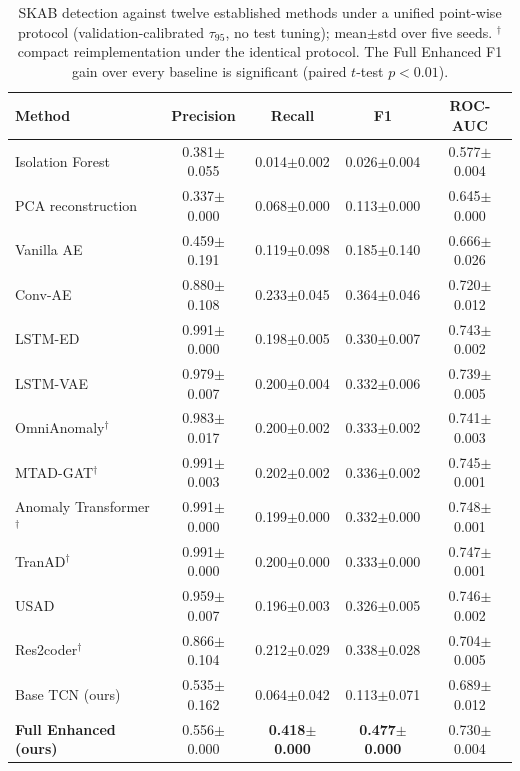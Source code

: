\begin{table}[H]
\centering
\caption{SKAB detection against twelve established methods under a unified point-wise protocol (validation-calibrated $\tau_{95}$, no test tuning); mean$\pm$std over five seeds. $^{\dagger}$ compact reimplementation under the identical protocol. The Full Enhanced F1 gain over every baseline is significant (paired $t$-test $p<0.01$).}
\label{table:skab_baselines}
\setlength{\tabcolsep}{5pt}\small
\begin{tabular}{lcccc}
\toprule
\textbf{Method} & \textbf{Precision} & \textbf{Recall} & \textbf{F1} & \textbf{ROC-AUC} \\
\midrule
Isolation Forest~\cite{liu2008isolation} & 0.381$\pm$0.055 & 0.014$\pm$0.002 & 0.026$\pm$0.004 & 0.577$\pm$0.004 \\
PCA reconstruction & 0.337$\pm$0.000 & 0.068$\pm$0.000 & 0.113$\pm$0.000 & 0.645$\pm$0.000 \\
Vanilla AE~\cite{skab_dataset} & 0.459$\pm$0.191 & 0.119$\pm$0.098 & 0.185$\pm$0.140 & 0.666$\pm$0.026 \\
Conv-AE~\cite{skab_dataset} & 0.880$\pm$0.108 & 0.233$\pm$0.045 & 0.364$\pm$0.046 & 0.720$\pm$0.012 \\
LSTM-ED~\cite{malhotra2016lstmed} & 0.991$\pm$0.000 & 0.198$\pm$0.005 & 0.330$\pm$0.007 & 0.743$\pm$0.002 \\
LSTM-VAE~\cite{park2018lstmvae} & 0.979$\pm$0.007 & 0.200$\pm$0.004 & 0.332$\pm$0.006 & 0.739$\pm$0.005 \\
OmniAnomaly$^{\dagger}$~\cite{su2019robust} & 0.983$\pm$0.017 & 0.200$\pm$0.002 & 0.333$\pm$0.002 & 0.741$\pm$0.003 \\
MTAD-GAT$^{\dagger}$~\cite{zhao2020mtadgat} & 0.991$\pm$0.003 & 0.202$\pm$0.002 & 0.336$\pm$0.002 & 0.745$\pm$0.001 \\
Anomaly Transformer$^{\dagger}$~\cite{xu2022anomalytransformer} & 0.991$\pm$0.000 & 0.199$\pm$0.000 & 0.332$\pm$0.000 & 0.748$\pm$0.001 \\
TranAD$^{\dagger}$~\cite{tuli2022tranad} & 0.991$\pm$0.000 & 0.200$\pm$0.000 & 0.333$\pm$0.000 & 0.747$\pm$0.001 \\
USAD~\cite{audibert2020usad} & 0.959$\pm$0.007 & 0.196$\pm$0.003 & 0.326$\pm$0.005 & 0.746$\pm$0.002 \\
Res2coder$^{\dagger}$~\cite{wang2025res2coder} & 0.866$\pm$0.104 & 0.212$\pm$0.029 & 0.338$\pm$0.028 & 0.704$\pm$0.005 \\
\midrule
Base TCN (ours) & 0.535$\pm$0.162 & 0.064$\pm$0.042 & 0.113$\pm$0.071 & 0.689$\pm$0.012 \\
\textbf{Full Enhanced (ours)} & 0.556$\pm$0.000 & \textbf{0.418$\pm$0.000} & \textbf{0.477$\pm$0.000} & 0.730$\pm$0.004 \\
\bottomrule
\end{tabular}
\end{table}
